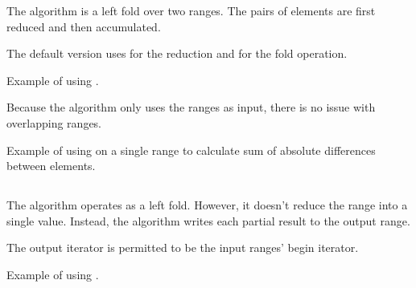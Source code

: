 The  algorithm is a left fold over two ranges. The pairs of elements are first reduced and then accumulated.


The default version uses  for the reduction and  for the fold operation.

\begin{codebox}[]{\href{https://compiler-explorer.com/z/j9M7eGxnd}{\ExternalLink}}
\footnotesize Example of using .
\tcblower
{}
\end{codebox}

Because the algorithm only uses the ranges as input, there is no issue with overlapping ranges.

\begin{codebox}[]{\href{https://compiler-explorer.com/z/1G6Yc3rhn}{\ExternalLink}}
\footnotesize Example of using  on a single range to calculate sum of absolute differences between elements.
\tcblower
{}
\end{codebox}

\subsection{\texorpdfstring{}{\texttt{std::partial\_sum}}}

The  algorithm operates as a left fold. However, it doesn't reduce the range into a single value. Instead, the algorithm writes each partial result to the output range.


The output iterator is permitted to be the input ranges' begin iterator.

\begin{codebox}[]{\href{https://compiler-explorer.com/z/G83s3edax}{\ExternalLink}}
\footnotesize Example of using .
\tcblower
{}
\end{codebox}


